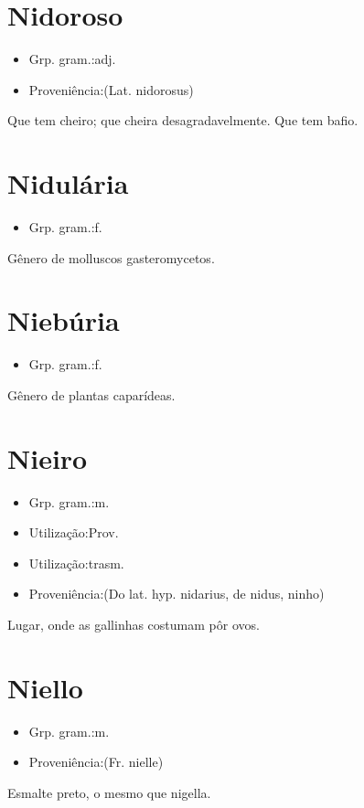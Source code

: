 \section{Nidoroso}
\begin{itemize}
\item {Grp. gram.:adj.}
\end{itemize}
\begin{itemize}
\item {Proveniência:(Lat. \textunderscore nidorosus\textunderscore )}
\end{itemize}
Que tem cheiro; que cheira desagradavelmente.
Que tem bafio.
\section{Nidulária}
\begin{itemize}
\item {Grp. gram.:f.}
\end{itemize}
Gênero de molluscos gasteromycetos.
\section{Niebúria}
\begin{itemize}
\item {Grp. gram.:f.}
\end{itemize}
Gênero de plantas caparídeas.
\section{Nieiro}
\begin{itemize}
\item {Grp. gram.:m.}
\end{itemize}
\begin{itemize}
\item {Utilização:Prov.}
\end{itemize}
\begin{itemize}
\item {Utilização:trasm.}
\end{itemize}
\begin{itemize}
\item {Proveniência:(Do lat. hyp. \textunderscore nidarius\textunderscore , de \textunderscore nidus\textunderscore , ninho)}
\end{itemize}
Lugar, onde as gallinhas costumam pôr ovos.
\section{Niello}
\begin{itemize}
\item {Grp. gram.:m.}
\end{itemize}
\begin{itemize}
\item {Proveniência:(Fr. \textunderscore nielle\textunderscore )}
\end{itemize}
Esmalte preto, o mesmo que nigella.
